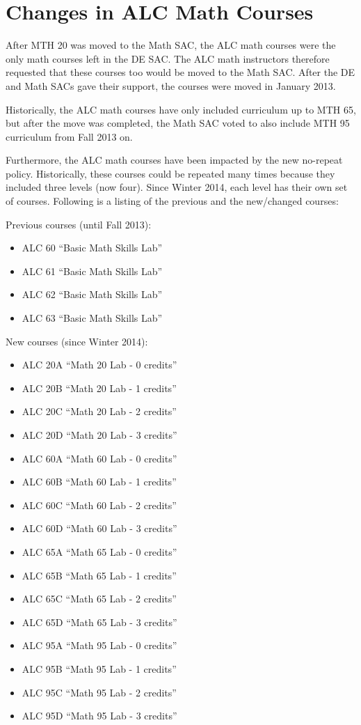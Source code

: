 \chapter{Changes in ALC Math Courses}\label{app:sec:alc}
After MTH 20 was moved to the Math SAC, the ALC math courses were the only math courses left in the DE SAC. The ALC math instructors therefore requested that these courses too would be moved to the Math SAC. After the DE and Math SACs gave their support, the courses were moved in January 2013.

Historically, the ALC math courses have only included curriculum up to MTH 65, but after the move was completed, the Math SAC voted to also include MTH 95 curriculum from Fall 2013 on.

Furthermore, the ALC math courses have been impacted by the new no-repeat policy. Historically, these courses could be repeated many times because they included three levels (now four). Since Winter 2014, each level has their own set of courses. Following is a listing  of the previous and the new/changed courses:

Previous courses (until Fall 2013):
\begin{itemize}[label={}]
  \item ALC 60 ``Basic Math Skills Lab''
  \item ALC 61 ``Basic Math Skills Lab''
  \item ALC 62 ``Basic Math Skills Lab''
  \item ALC 63 ``Basic Math Skills Lab''
\end{itemize}
New courses (since Winter 2014):
\begin{itemize}[label={}]
  \item ALC 20A ``Math 20 Lab - 0 credits'' 
  \item ALC 20B ``Math 20 Lab - 1 credits'' 
  \item ALC 20C ``Math 20 Lab - 2 credits'' 
  \item ALC 20D ``Math 20 Lab - 3 credits'' 

  \item ALC 60A ``Math 60 Lab - 0 credits'' 
  \item ALC 60B ``Math 60 Lab - 1 credits'' 
  \item ALC 60C ``Math 60 Lab - 2 credits'' 
  \item ALC 60D ``Math 60 Lab - 3 credits'' 

  \item ALC 65A ``Math 65 Lab - 0 credits'' 
  \item ALC 65B ``Math 65 Lab - 1 credits'' 
  \item ALC 65C ``Math 65 Lab - 2 credits'' 
  \item ALC 65D ``Math 65 Lab - 3 credits'' 

  \item ALC 95A ``Math 95 Lab - 0 credits'' 
  \item ALC 95B ``Math 95 Lab - 1 credits'' 
  \item ALC 95C ``Math 95 Lab - 2 credits'' 
  \item ALC 95D ``Math 95 Lab - 3 credits''
\end{itemize}

